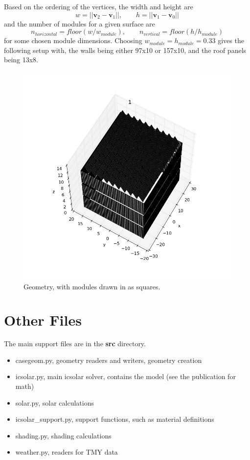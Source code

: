 \documentclass[11pt]{article}
\begin{document}
Based on the ordering of the vertices, the width and height are 
\[ w = ||\mathbf{v}_2-\mathbf{v}_1||, \qquad h = ||\mathbf{v}_1-\mathbf{v}_0||
\]
and the number of modules for a given surface are 
\[
n_{horizontal} = floor(w/w_{module}), \qquad n_{vertical} = floor(h/h_{module})
\]
for some chosen module dimensions. Choosing $w_{module} = h_{module} = 0.33$ gives the following setup with, the walls being either 97x10 or 157x10, and the roof panels being 13x8.

\begin{figure}
\centering
\includegraphics[width=1.0\textwidth]{images/whole-building-all.png}
\caption{Geometry, with modules drawn in as squares.}
\label{fig:normals}
\end{figure}
\section{Other Files}
The main support files are in the {\bf src} directory.
\begin{itemize}
\item casegeom.py, geometry readers and writers, geometry creation
\item icsolar.py, main icsolar solver, contains the model (see the publication for math)
\item solar.py, solar calculations 
\item icsolar\_support.py, support functions, such as material definitions
\item shading.py, shading calculations
\item weather.py, readers for TMY data
\end{itemize}
\end{document}
